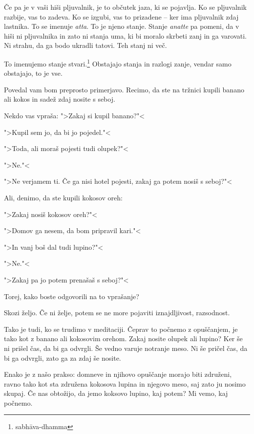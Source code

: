 Če pa je v vaši hiši pljuvalnik, je to občutek jaza, ki se pojavlja. Ko se pljuvalnik razbije, vas to zadeva. Ko se izgubi, vas to prizadene – ker ima pljuvalnik zdaj lastnika. To se imenuje \emph{atta}. To je njeno stanje. Stanje \emph{anatte} pa pomeni, da v hiši ni pljuvalnika in zato ni stanja uma, ki bi moralo skrbeti zanj in ga varovati. Ni strahu, da ga bodo ukradli tatovi. Teh stanj ni več.

To imenujemo stanje stvari.\footnote{sabhāva-dhamma} Obstajajo stanja in razlogi zanje, vendar samo obstajajo, to je vse.

\clearpage

\enlargethispage{10cm}


Povedal vam bom preprosto primerjavo. Recimo, da ste na tržnici kupili banano ali kokos in sadež zdaj nosite s seboj.

Nekdo vas vpraša: ">Zakaj si kupil banano?"<

">Kupil sem jo, da bi jo pojedel."<

">Toda, ali moraš pojesti tudi olupek?"<

">Ne."<

">Ne verjamem ti. Če ga nisi hotel pojesti, zakaj ga potem nosiš s seboj?"<

Ali, denimo, da ste kupili kokosov oreh:

">Zakaj nosiš kokosov oreh?"<

">Domov ga nesem, da bom pripravil kari."<

">In vanj boš dal tudi lupino?"<

">Ne."<

">Zakaj pa jo potem prenašaš s seboj?"<

Torej, kako boste odgovorili na to vprašanje?

Skozi željo. Če ni želje, potem se ne more pojaviti iznajdljivost, razsodnost.

Tako je tudi, ko se trudimo v meditaciji. Čeprav to počnemo z opuščanjem, je tako kot z banano ali kokosovim orehom. Zakaj nosite olupek ali lupino? Ker še ni prišel čas, da bi ga odvrgli. Še vedno varuje notranje meso. Ni še pričel čas, da bi ga odvrgli, zato ga za zdaj še nosite.

Enako je z našo prakso: domneve in njihovo opuščanje morajo biti združeni, ravno tako kot sta združena kokosova lupina in njegovo meso, saj zato ju nosimo skupaj. Če nas obtožijo, da jemo koksovo lupino, kaj potem? Mi vemo, kaj počnemo.

